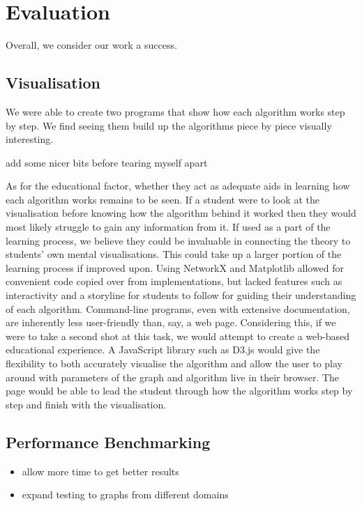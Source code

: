 \section{Evaluation}

Overall, we consider our work a success.

\subsection{Visualisation}

We were able to create two programs that show how each algorithm works step by
step. We find seeing them build up the algorithms piece by piece visually
interesting.

add some nicer bits before tearing myself apart

As for the educational factor, whether they act as adequate aids in learning
how each algorithm works remains to be seen. If a student were to look at the
visualisation before knowing how the algorithm behind it worked then they would
most likely struggle to gain any information from it. If used as a part of the
learning process, we believe they could be invaluable in connecting the theory
to students' own mental visualisations. This could take up a larger portion of
the learning process if improved upon. Using NetworkX and Matplotlib allowed
for convenient code copied over from implementations, but lacked features such
as interactivity and a storyline for students to follow for guiding their
understanding of each algorithm. Command-line programs, even with extensive
documentation, are inherently less user-friendly than, say, a web page.
Considering this, if we were to take a second shot at this task, we would
attempt to create a web-based educational experience. A JavaScript library such
as D3.js \cite{bostock2011d3} would give the flexibility to both accurately
visualise the algorithm and allow the user to play around with parameters of
the graph and algorithm live in their browser. The page would be able to lead
the student through how the algorithm works step by step and finish with the
visualisation.

\subsection{Performance Benchmarking}

\begin{itemize}
    \item
          allow more time to get better results
    \item
          expand testing to graphs from different domains
\end{itemize}

